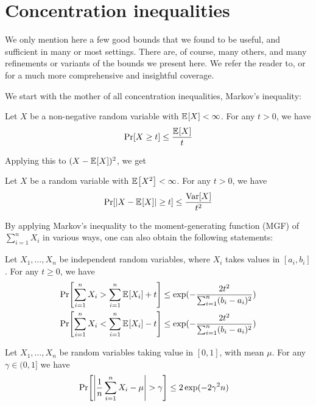\documentclass[10pt]{article}
\begin{document}
\clearpage
\section{Concentration inequalities}
We only mention here a few good bounds that we found to be useful, and sufficient in many or most settings. There are, of course, many others, and many refinements or variants of the bounds we present here. We refer the reader to, \eg \cite[Chapter~2]{Vershynin18} or~\cite{BoucheronLM13} for a much more comprehensive and insightful coverage. 

We start with the mother of all concentration inequalities, Markov's inequality:
\begin{theorem}
  \label{theo:markov}
Let $X$ be a non-negative random variable with $\bEE{X} < \infty$. For any $t > 0$, we have
\[  
  \bPr{ X \geq t } \leq \frac{\bEE{X}}{t}
\]
\end{theorem}
\noindent Applying this to $(X-\bEE{X})^2$, we get 
\begin{theorem}
  \label{theo:chebyshev}
Let $X$ be a random variable with $\bEE{X^2} < \infty$. For any $t > 0$, we have
\[  
  \bPr{ \abs{X-\bEE{X}} \geq t } \leq \frac{\var[X]}{t^2}
\]
\end{theorem}
By applying Markov's inequality to the moment-generating function (MGF) of $\sum_{i=1}^n X_i$ in various ways, one can also obtain the following statements:
\begin{theorem}
  \label{theo:hoeffding}
Let $X_1,\dots,X_n$ be independent random variables, where $X_i$ takes values in $[a_i,b_i]$. For any $t \geq 0$, we have
\begin{align}
\bPr{ \sum_{i=1}^n X_i   > \sum_{i=1}^n \bEE{X_i} + t }  
&\leq \exp(-\frac{2 t^2}{\sum_{i=1}^n (b_i-a_i)^2}) \\
\bPr{\sum_{i=1}^n X_i  < \sum_{i=1}^n \bEE{X_i} - t }
 &\leq \exp(-\frac{2 t^2}{\sum_{i=1}^n (b_i-a_i)^2})
 \end{align}
\end{theorem}

\begin{corollary}
  \label{coro:hoeffding}
Let $X_1,\dots,X_n$ be \iid random variables taking value in $[0,1]$, with mean $\mu$. For any $\gamma \in (0,1]$ we have
\begin{align}
\bPr{ \abs{\frac{1}{n}\sum_{i=1}^n X_i  - \mu} > \gamma }
 &\leq 2\exp(-2 \gamma^2 n)
\end{align}
\end{corollary}
\end{document}
